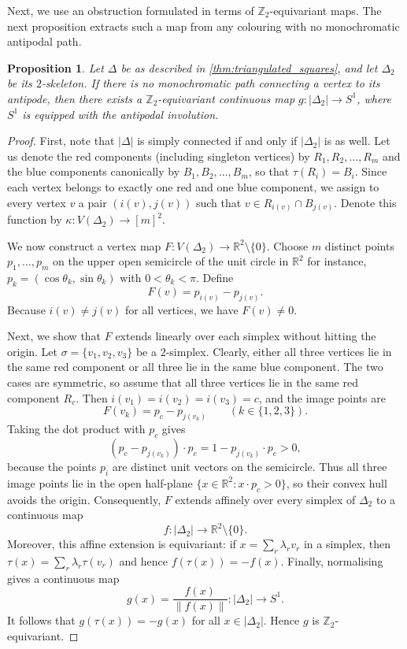 \documentclass[12pt,UKenglish]{amsart}
\theoremstyle{plain}
\newtheorem{proposition}[proposition]{Proposition}
\theoremstyle{definition}
\theoremstyle{remark}
\begin{document}
Next, we use an obstruction formulated in terms of $\mathbb Z_2$-equivariant maps. The next proposition extracts such a map from any colouring with no monochromatic antipodal path.
\begin{proposition}\label{prop:existence-equivariant-map}
Let $\Delta$ be as described in \cref{thm:triangulated_squares}, and let $\Delta_2$ be its $2$-skeleton. If there is no monochromatic path connecting a vertex to its antipode, then there exists a $\mathbb Z_2$-equivariant continuous map $g\colon |\Delta_2| \to S^1$, where $S^1$ is equipped with the antipodal involution.
\end{proposition}
\begin{proof}
First, note that $|\Delta|$ is simply connected if and only if $|\Delta_2|$ is as well. Let us denote the red components (including singleton vertices) by $R_1,R_2,\dots,R_m$ and the blue components canonically by $B_1,B_2,\dots,B_m$, so that $\tau(R_i)=B_i$. Since each vertex belongs to exactly one red and one blue component, we assign to every vertex $v$ a pair $(i(v),j(v))$ such that $v\in R_{i(v)}\cap B_{j(v)}$. Denote this function by $\kappa:V(\Delta_2)\rightarrow [m]^2$.

We now construct a vertex map $F\colon V(\Delta_2) \to \mathbb{R}^2\setminus\{0\}$. Choose $m$ distinct points $p_1,\dots,p_m$ on the upper open semicircle of the unit circle in $\mathbb{R}^2$ for instance, $p_k=(\cos\theta_k,\sin\theta_k)$ with $0<\theta_k<\pi$. Define
\[
F(v)=p_{i(v)}-p_{j(v)}.
\]
Because $i(v)\neq j(v)$ for all vertices, we have $F(v)\neq 0$.

Next, we show that $F$ extends linearly over each simplex without hitting the origin. Let $\sigma=\{v_1,v_2,v_3\}$ be a $2$-simplex. Clearly, either all three vertices lie in the same red component or all three lie in the same blue component. The two cases are symmetric, so assume that all three vertices lie in the same red component $R_c$. Then $i(v_1)=i(v_2)=i(v_3)=c$, and the image points are
\[
F(v_k)=p_c-p_{j(v_k)} \qquad (k\in\{1,2,3\}).
\]
Taking the dot product with $p_c$ gives
\[
(p_c-p_{j(v_k)})\cdot p_c = 1-p_{j(v_k)}\cdot p_c>0,
\]
because the points $p_i$ are distinct unit vectors on the semicircle. Thus all three image points lie in the open half-plane $\{x\in\mathbb R^2 : x\cdot p_c>0\}$, so their convex hull avoids the origin. Consequently, $F$ extends affinely over every simplex of $\Delta_2$ to a continuous map
\[
f\colon |\Delta_2|\to\mathbb R^2\setminus\{0\}.
\]
Moreover, this affine extension is equivariant: if \(x=\sum_r\lambda_r v_r\) in a simplex, then \(\tau(x)=\sum_r\lambda_r\tau(v_r)\) and hence \(f(\tau(x))=-f(x)\). Finally, normalising gives a continuous map
\[
g(x)=\frac{f(x)}{\|f(x)\|}\colon |\Delta_2|\to S^1.
\]
It follows that $g(\tau(x))=-g(x)$ for all $x\in|\Delta_2|$. Hence $g$ is $\mathbb Z_2$-equivariant.
\end{proof}
\end{document}

